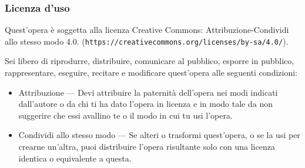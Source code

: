 \begin{frame}[containsverbatim]\frametitle{Licenza d'uso}
	\small

	Quest'opera {\`e} soggetta alla licenza Creative Commons:
	Attribuzione-Condividi allo stesso modo 4.0.
	(\verb+https://creativecommons.org/licenses/by-sa/4.0/+).

	Sei libero di riprodurre, distribuire, comunicare al pubblico, esporre
	in pubblico, rappresentare, eseguire, recitare e modificare quest'opera
	alle seguenti condizioni:
	\begin{itemize}
		\item
		      Attribuzione — Devi attribuire la paternit{\`a} dell'opera nei modi
		      indicati dall'autore o da chi ti ha dato l'opera in licenza e in modo tale da
		      non suggerire che essi avallino te o il modo in cui tu usi l'opera.
		\item
		      Condividi allo stesso modo — Se alteri o trasformi quest'opera, o se
		      la usi per crearne un'altra, puoi distribuire l'opera risultante solo con
		      una licenza identica o equivalente a  questa.
	\end{itemize}
\end{frame}


